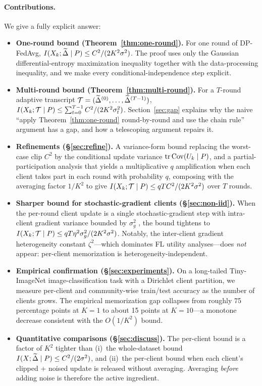 \paragraph{Contributions.} We give a fully explicit answer:
\begin{itemize}
\setlength\itemsep{2pt}
\item \textbf{One-round bound (Theorem~\ref{thm:one-round}).} For one round of DP-FedAvg, \(I(X_k;\widetilde{\Delta} \mid P)\le C^2/(2K^2\sigma^2)\). The proof uses only the Gaussian differential-entropy maximization inequality together with the data-processing inequality, and we make every conditional-independence step explicit.
\item \textbf{Multi-round bound (Theorem~\ref{thm:multi-round}).} For a \(T\)-round adaptive transcript \(\mathcal{T} = (\widetilde{\Delta}^{(0)},\dots,\widetilde{\Delta}^{(T-1)})\), \(I(X_k;\mathcal{T}\mid P)\le \sum_{t=0}^{T-1} C^2/(2K^2\sigma_t^2)\). Section~\ref{sec:gap} explains why the naive ``apply Theorem~\ref{thm:one-round} round-by-round and use the chain rule'' argument has a gap, and how a telescoping argument repairs it.
\item \textbf{Refinements (\S\ref{sec:refine}).} A variance-form bound replacing the worst-case clip \(C^2\) by the conditional update variance \(\operatorname{tr}\operatorname{Cov}(U_k\mid P)\), and a partial-participation analysis that yields a multiplicative \(q\) amplification when each client takes part in each round with probability \(q\), composing with the averaging factor \(1/K^2\) to give \(I(X_k;\mathcal{T}\mid P)\le qTC^2/(2K^2\sigma^2)\) over \(T\) rounds.
\item \textbf{Sharper bound for stochastic-gradient clients (\S\ref{sec:non-iid}).} When the per-round client update is a single stochastic-gradient step with intra-client gradient variance bounded by \(\sigma_g^2\) \citep[the standard FL assumption; cf.][Assumption~3]{Bornstein2022SWIFT}, the bound tightens to \(I(X_k;\mathcal{T}\mid P)\le qT\eta^2\sigma_g^2/(2K^2\sigma^2)\). Notably, the inter-client gradient heterogeneity constant \(\zeta^2\)---which dominates FL utility analyses---does \emph{not} appear: per-client memorization is heterogeneity-independent.
\item \textbf{Empirical confirmation (\S\ref{sec:experiments}).} On a long-tailed Tiny-ImageNet image-classification task with a Dirichlet client partition, we measure per-client and community-wise train/test accuracy as the number of clients grows. The empirical memorization gap collapses from roughly 75 percentage points at \(K=1\) to about 15 points at \(K=10\)---a monotone decrease consistent with the \(O(1/K^2)\) bound.
\item \textbf{Quantitative comparisons (\S\ref{sec:discuss}).} The per-client bound is a factor of \(K^2\) tighter than (i)~the whole-dataset bound \(I(X;\widetilde{\Delta}\mid P)\le C^2/(2\sigma^2)\), and (ii)~the per-client bound when each client's clipped + noised update is released without averaging. Averaging \emph{before} adding noise is therefore the active ingredient.
\end{itemize}

